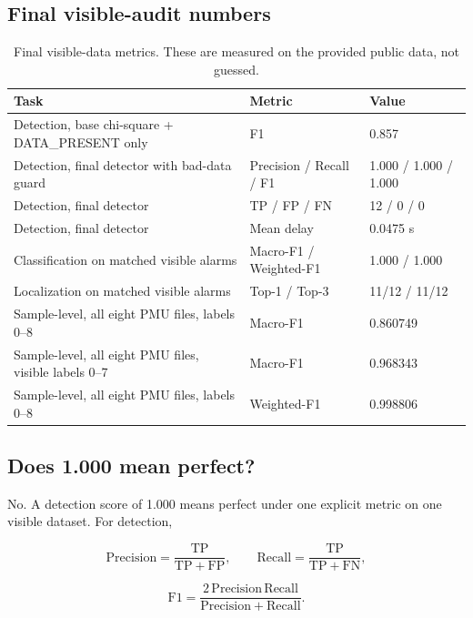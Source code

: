 \documentclass[11pt]{article}
\begin{document}
\subsection{Final visible-audit numbers}

\begin{table}[H]
\centering
\caption{Final visible-data metrics. These are measured on the provided public data, not guessed.}
\begin{tabular}{lll}
\toprule
Task & Metric & Value \\
\midrule
Detection, base chi-square + DATA\_PRESENT only & F1 & 0.857 \\
Detection, final detector with bad-data guard & Precision / Recall / F1 & 1.000 / 1.000 / 1.000 \\
Detection, final detector & TP / FP / FN & 12 / 0 / 0 \\
Detection, final detector & Mean delay & 0.0475 s \\
Classification on matched visible alarms & Macro-F1 / Weighted-F1 & 1.000 / 1.000 \\
Localization on matched visible alarms & Top-1 / Top-3 & 11/12 / 11/12 \\
Sample-level, all eight PMU files, labels 0--8 & Macro-F1 & 0.860749 \\
Sample-level, all eight PMU files, visible labels 0--7 & Macro-F1 & 0.968343 \\
Sample-level, all eight PMU files, labels 0--8 & Weighted-F1 & 0.998806 \\
\bottomrule
\end{tabular}
\label{tab:summary_metrics}
\end{table}

\subsection{Does 1.000 mean perfect?}

No. A detection score of 1.000 means perfect under one explicit metric on one
visible dataset. For detection,

\begin{equation}
  \mathrm{Precision} = \frac{\mathrm{TP}}{\mathrm{TP}+\mathrm{FP}}, \qquad
  \mathrm{Recall} = \frac{\mathrm{TP}}{\mathrm{TP}+\mathrm{FN}},
\end{equation}

\begin{equation}
  \mathrm{F1} =
  \frac{2\,\mathrm{Precision}\,\mathrm{Recall}}
       {\mathrm{Precision}+\mathrm{Recall}}.
\end{equation}
\end{document}

